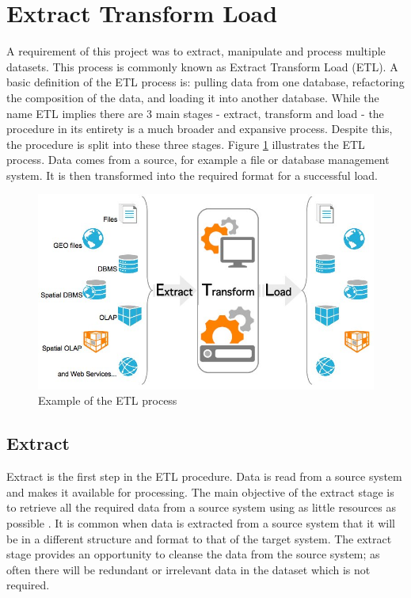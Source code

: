 \section{Extract Transform Load}\label{etlprocess}
A requirement of this project was to extract, manipulate and process multiple datasets. This process is commonly known as Extract Transform Load (ETL). A basic definition of the ETL process is: pulling data from one database, refactoring the composition of the data, and loading it into another database. While the name ETL implies there are 3 main stages - extract, transform and load - the procedure in its entirety is a much broader and expansive process. Despite this, the procedure is split into these three stages. Figure \ref{fig:etl} illustrates the ETL process. Data comes from a source, for example a file or database management system. It is then transformed into the required format for a successful load. \begin{figure}[h]\begin{center}\includegraphics[width=0.8\linewidth]{images/etl.jpg}\caption{Example of the ETL process}\label{fig:etl}\end{center}\end{figure}

\subsection{Extract}
Extract is the first step in the ETL procedure. Data is read from a source system and makes it available for processing. The main objective of the extract stage is to retrieve all the required data from a source system using as little resources as possible \cite{etlref1}. It is common when data is extracted from a source system that it will be in a different structure and format to that of the target system. The extract stage provides an opportunity to cleanse the data from the source system; as often there will be redundant or irrelevant data in the dataset which is not required.

